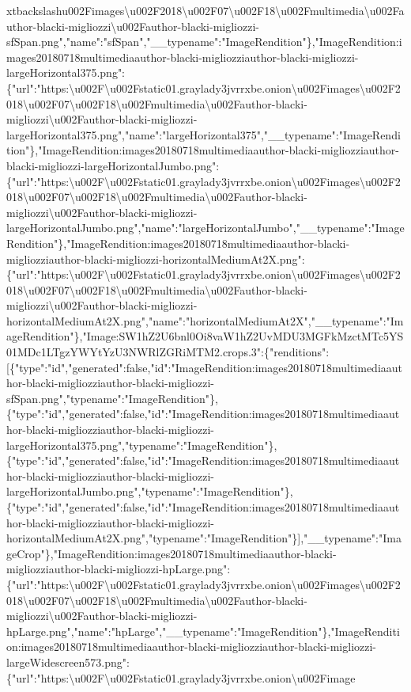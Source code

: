 xtbackslash{}u002Fimages\textbackslash{}u002F2018\textbackslash{}u002F07\textbackslash{}u002F18\textbackslash{}u002Fmultimedia\textbackslash{}u002Fauthor-blacki-migliozzi\textbackslash{}u002Fauthor-blacki-migliozzi-sfSpan.png","name":"sfSpan","\_\_typename":"ImageRendition"\},"ImageRendition:images20180718multimediaauthor-blacki-migliozziauthor-blacki-migliozzi-largeHorizontal375.png":\{"url":"https:\textbackslash{}u002F\textbackslash{}u002Fstatic01.graylady3jvrrxbe.onion\textbackslash{}u002Fimages\textbackslash{}u002F2018\textbackslash{}u002F07\textbackslash{}u002F18\textbackslash{}u002Fmultimedia\textbackslash{}u002Fauthor-blacki-migliozzi\textbackslash{}u002Fauthor-blacki-migliozzi-largeHorizontal375.png","name":"largeHorizontal375","\_\_typename":"ImageRendition"\},"ImageRendition:images20180718multimediaauthor-blacki-migliozziauthor-blacki-migliozzi-largeHorizontalJumbo.png":\{"url":"https:\textbackslash{}u002F\textbackslash{}u002Fstatic01.graylady3jvrrxbe.onion\textbackslash{}u002Fimages\textbackslash{}u002F2018\textbackslash{}u002F07\textbackslash{}u002F18\textbackslash{}u002Fmultimedia\textbackslash{}u002Fauthor-blacki-migliozzi\textbackslash{}u002Fauthor-blacki-migliozzi-largeHorizontalJumbo.png","name":"largeHorizontalJumbo","\_\_typename":"ImageRendition"\},"ImageRendition:images20180718multimediaauthor-blacki-migliozziauthor-blacki-migliozzi-horizontalMediumAt2X.png":\{"url":"https:\textbackslash{}u002F\textbackslash{}u002Fstatic01.graylady3jvrrxbe.onion\textbackslash{}u002Fimages\textbackslash{}u002F2018\textbackslash{}u002F07\textbackslash{}u002F18\textbackslash{}u002Fmultimedia\textbackslash{}u002Fauthor-blacki-migliozzi\textbackslash{}u002Fauthor-blacki-migliozzi-horizontalMediumAt2X.png","name":"horizontalMediumAt2X","\_\_typename":"ImageRendition"\},"Image:SW1hZ2U6bnl0Oi8vaW1hZ2UvMDU3MGFkMzctMTc5YS01MDc1LTgzYWYtYzU3NWRlZGRiMTM2.crops.3":\{"renditions":{[}\{"type":"id","generated":false,"id":"ImageRendition:images20180718multimediaauthor-blacki-migliozziauthor-blacki-migliozzi-sfSpan.png","typename":"ImageRendition"\},\{"type":"id","generated":false,"id":"ImageRendition:images20180718multimediaauthor-blacki-migliozziauthor-blacki-migliozzi-largeHorizontal375.png","typename":"ImageRendition"\},\{"type":"id","generated":false,"id":"ImageRendition:images20180718multimediaauthor-blacki-migliozziauthor-blacki-migliozzi-largeHorizontalJumbo.png","typename":"ImageRendition"\},\{"type":"id","generated":false,"id":"ImageRendition:images20180718multimediaauthor-blacki-migliozziauthor-blacki-migliozzi-horizontalMediumAt2X.png","typename":"ImageRendition"\}{]},"\_\_typename":"ImageCrop"\},"ImageRendition:images20180718multimediaauthor-blacki-migliozziauthor-blacki-migliozzi-hpLarge.png":\{"url":"https:\textbackslash{}u002F\textbackslash{}u002Fstatic01.graylady3jvrrxbe.onion\textbackslash{}u002Fimages\textbackslash{}u002F2018\textbackslash{}u002F07\textbackslash{}u002F18\textbackslash{}u002Fmultimedia\textbackslash{}u002Fauthor-blacki-migliozzi\textbackslash{}u002Fauthor-blacki-migliozzi-hpLarge.png","name":"hpLarge","\_\_typename":"ImageRendition"\},"ImageRendition:images20180718multimediaauthor-blacki-migliozziauthor-blacki-migliozzi-largeWidescreen573.png":\{"url":"https:\textbackslash{}u002F\textbackslash{}u002Fstatic01.graylady3jvrrxbe.onion\textbackslash{}u002Fimage